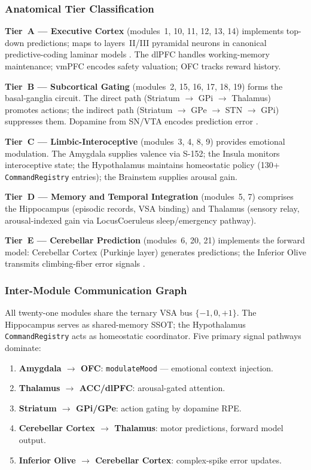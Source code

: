 \subsubsection{Anatomical Tier Classification}

\textbf{Tier~A — Executive Cortex} (modules~1, 10, 11, 12, 13, 14)
implements top-down predictions; maps to layers~II/III pyramidal neurons in
canonical predictive-coding laminar models
\cite{friston_kiebel_2009}.  The dlPFC handles working-memory
maintenance; vmPFC encodes safety valuation; OFC tracks reward history.

\textbf{Tier~B — Subcortical Gating} (modules~2, 15, 16, 17, 18, 19)
forms the basal-ganglia circuit.  The direct path
(Striatum $\to$ GPi $\to$ Thalamus) promotes actions; the indirect path
(Striatum $\to$ GPe $\to$ STN $\to$ GPi) suppresses them.  Dopamine from
SN/VTA encodes prediction error \cite{schultz_2016}.

\textbf{Tier~C — Limbic-Interoceptive} (modules~3, 4, 8, 9)
provides emotional modulation.  The Amygdala supplies valence via S-152; the
Insula monitors interoceptive state; the Hypothalamus maintains homeostatic
policy (130+ \texttt{CommandRegistry} entries); the Brainstem supplies arousal
gain.

\textbf{Tier~D — Memory and Temporal Integration} (modules~5, 7)
comprises the Hippocampus (episodic records, VSA binding) and Thalamus
(sensory relay, arousal-indexed gain via LocusCoeruleus sleep/emergency
pathway).

\textbf{Tier~E — Cerebellar Prediction} (modules~6, 20, 21)
implements the forward model: Cerebellar Cortex (Purkinje layer) generates
predictions; the Inferior Olive transmits climbing-fiber error signals
\cite{nguyen_person_2025}.

\subsubsection{Inter-Module Communication Graph}

All twenty-one modules share the ternary VSA bus $\{-1, 0, +1\}$.  The
Hippocampus serves as shared-memory SSOT; the Hypothalamus
\texttt{CommandRegistry} acts as homeostatic coordinator.  Five primary signal
pathways dominate:
\begin{enumerate}
  \item \textbf{Amygdala $\to$ OFC}: \texttt{modulateMood} — emotional context
    injection.
  \item \textbf{Thalamus $\to$ ACC/dlPFC}: arousal-gated attention.
  \item \textbf{Striatum $\to$ GPi/GPe}: action gating by dopamine RPE.
  \item \textbf{Cerebellar Cortex $\to$ Thalamus}: motor predictions, forward
    model output.
  \item \textbf{Inferior Olive $\to$ Cerebellar Cortex}: complex-spike error
    updates.
\end{enumerate}


